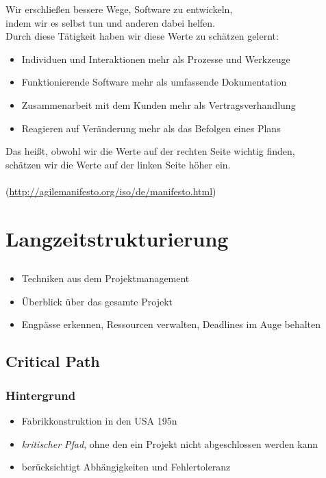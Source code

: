 \documentclass[%
	handout
]{beamer}
\begin{document}
		\begin{frame}
			\begin{center}
				Wir erschließen bessere Wege, Software zu entwickeln,\\
				indem wir es selbst tun und anderen dabei helfen.\\
				Durch diese Tätigkeit haben wir diese Werte zu schätzen gelernt:\\
			\end{center}
			\pause
			\begin{itemize}
				\item Individuen und Interaktionen mehr als Prozesse und Werkzeuge
				\item Funktionierende Software mehr als umfassende Dokumentation
				\item Zusammenarbeit mit dem Kunden mehr als Vertragsverhandlung
				\item Reagieren auf Veränderung mehr als das Befolgen eines Plans
			\end{itemize}
			\pause
			\begin{center}
				Das heißt, obwohl wir die Werte auf der rechten Seite wichtig finden,\\
				schätzen wir die Werte auf der linken Seite höher ein.\-\\\-\\
				(\url{http://agilemanifesto.org/iso/de/manifesto.html})
			\end{center}
		\end{frame}
		
\section{Langzeitstrukturierung}
	\subsection{}
		\begin{frame}
			\begin{itemize}
				\item Techniken aus dem Projektmanagement\pause
				\item Überblick über das gesamte Projekt\pause
				\item Engpässe erkennen, Ressourcen verwalten, Deadlines im Auge behalten\pause
			\end{itemize}
		\end{frame}
		
	\subsection{Critical Path}
		\begin{frame}
			\frametitle{Hintergrund}
			\begin{itemize}
				\item Fabrikkonstruktion in den USA 195n
				\item \textit{kritischer Pfad}, ohne den ein Projekt nicht abgeschlossen werden kann
				\item berücksichtigt Abhängigkeiten und Fehlertoleranz
			\end{itemize}
		\end{frame}
		
\end{document}
